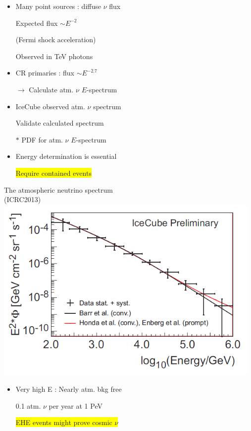 \twocolumn
\vspace*{5mm}
%
\begin{itemize}
\item Many point sources : diffuse $\nu$ flux
\item[] Expected flux $\sim E^{-2}$
\item[] (Fermi shock acceleration)
\item[] Observed in TeV photons
\item CR primaries : flux $\sim E^{-2.7}$
\item[] $\rightarrow$ Calculate atm. $\nu$ $E$-spectrum
\item IceCube observed atm. $\nu$ spectrum
\item[] Validate calculated spectrum
\item[$\ast$] {\blue PDF for atm. $\nu$ $E$-spectrum}
\item Energy determination is essential
\item[] \colorbox{yellow}{Require contained events}
\end{itemize}

\newpage 
%
\begin{center}
{\blue The atmospheric neutrino spectrum}\\
(ICRC2013)\\
\includegraphics[keepaspectratio,width=13cm]{atm-nu}
\end{center}
%
\begin{itemize}
\item Very high E : Nearly atm. bkg free
\item[] 0.1 atm. $\nu$ per year at 1 PeV
\item[] \colorbox{yellow}{EHE events might prove cosmic $\nu$}
\end{itemize}

